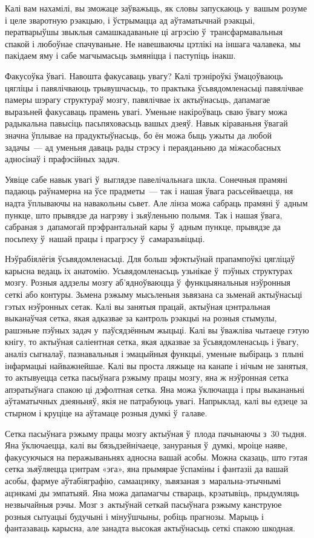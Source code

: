 Калі вам нахамілі, вы зможаце заўважыць, як словы запускаюць у~вашым розуме і целе зваротную рэакцыю, і ўстрымацца ад аўтаматычнай рэакцыі, ператварыўшы звыклыя самашкадаваньне ці агрэсію ў~трансфармавальныя спакой і любоўнае спачуваньне. Не навешваючы цэтлікі на іншага чалавека, мы пакідаем яму і сабе магчымасьць зьмяніцца і паступіць інакш.

Факусоўка ўвагі. Навошта факусаваць увагу? Калі трэніроўкі ўмацоўваюць цягліцы і павялічваюць трывушчасьць, то практыка ўсьвядомленасьці павялічвае памеры шэрагу структураў мозгу, павялічвае іх актыўнасьць, дапамагае выразьней факусаваць прамень увагі. Уменьне накіроўваць сваю ўвагу можа радыкальна павысіць пасьпяховасьць вашых дзеяў. Навык кіраваньня ўвагай значна ўплывае на прадуктыўнасьць, бо ён можа быць ужыты да любой задачы~--- ад уменьня даваць рады стрэсу і пераяданьню да міжасобасных адносінаў і прафэсійных задач.

Уявіце сабе навык увагі ў~выглядзе павелічальнага шкла. Сонечныя прамяні падаюць раўнамерна на ўсе прадметы~--- так і нашая ўвага расьсейваецца, ня надта ўплываючы на навакольны сьвет. Але лінза можа сабраць прамяні ў~адным пункце, што прывядзе да нагрэву і зьяўленьню полымя. Так і нашая ўвага, сабраная з~дапамогай прэфрантальнай кары ў~адным пункце, прывядзе да посьпеху ў~нашай працы і прагрэсу ў~самаразьвіцьці.

Нэўрабіялёгія ўсьвядомленасьці. Для больш эфэктыўнай прапампоўкі цягліцаў карысна ведаць іх анатомію. Усьвядомленасьць узьнікае ў~пэўных структурах мозгу. Розныя аддзелы мозгу аб'ядноўваюцца ў~функцыянальныя нэўронныя сеткі або контуры. Зьмена рэжыму мысьленьня зьвязана са зьменай актыўнасьці гэтых нэўронных сетак. Калі вы занятыя працай, актыўная цэнтральная выканаўчая сетка, якая адказвае за кантроль рэакцыі на розныя стымулы, рашэньне пэўных задач у~паўсядзённым жыцьці. Калі вы ўважліва чытаеце гэтую кнігу, то актыўная саліентная сетка, якая адказвае за ўсьвядомленасьць і ўвагу, аналіз сыгналаў, пазнавальныя і эмацыйныя функцыі, уменьне выбіраць з~плыні інфармацыі найважнейшае. Калі вы проста ляжыце на канапе і нічым не занятыя, то актывуецца сетка пасыўнага рэжыму працы мозгу, яна ж нэўронная сетка апэратыўнага спакою ці дэфолтная сетка. Яна можа ўключацца і пры выкананьні аўтаматычных дзеяньняў, якія не патрабуюць увагі. Напрыклад, калі вы едзеце за стырном і круціце на аўтамаце розныя думкі ў~галаве.

Сетка пасыўнага рэжыму працы мозгу актыўная ў~плода пачынаючы з~30 тыдня. Яна ўключаецца, калі вы бязьдзейнічаеце, занураныя ў~думкі, мроіце наяве, факусуючыся на перажываньнях адносна вашай асобы. Можна сказаць, што гэтая сетка зьяўляецца цэнтрам «эга», яна прымярае ўспаміны і фантазіі да вашай асобы, фармуе аўтабіяграфію, самаацэнку, зьвязаная з~маральна-этычнымі ацэнкамі ды эмпатыяй. Яна можа дапамагчы ствараць, крэатывіць, прыдумляць незвычайныя рэчы. Мозг з~актыўнай сеткай пасыўнага рэжыму канструюе розныя сытуацыі будучыні і мінуўшчыны, робіць прагнозы. Марыць і фантазаваць карысна, але занадта высокая актыўнасьць сеткі спакою шкодная.

